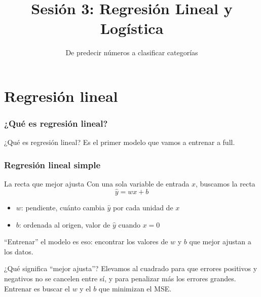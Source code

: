 

\title{Sesión 3: Regresión Lineal y Logística}
\subtitle{De predecir números a clasificar categorías}
\date{}



\frame{\titlepage}

\part{Regresión lineal}
\frame{\partpage}

\section{¿Qué es regresión lineal?}

\begin{frame}{¿Qué es regresión lineal?}
  Es el primer modelo que vamos a entrenar a full.
\end{frame}

\section{Regresión lineal simple}

\begin{frame}{La recta que mejor ajusta}
  Con una sola variable de entrada $x$, buscamos la recta
  $$\hat{y} = w x + b$$
  \begin{itemize}
    \item $w$: pendiente, cuánto cambia $\hat{y}$ por cada unidad de $x$
    \item $b$: ordenada al origen, valor de $\hat{y}$ cuando $x = 0$
  \end{itemize}
  ``Entrenar'' el modelo es eso: encontrar los valores de $w$ y
  $b$ que mejor ajustan a los datos.
\end{frame}

\begin{frame}{¿Qué significa ``mejor ajusta''?}
  Elevamos al cuadrado para que errores positivos y negativos no se
  cancelen entre sí, y para penalizar más los errores grandes. Entrenar es
  buscar el $w$ y el $b$ que minimizan el MSE.
\end{frame}

